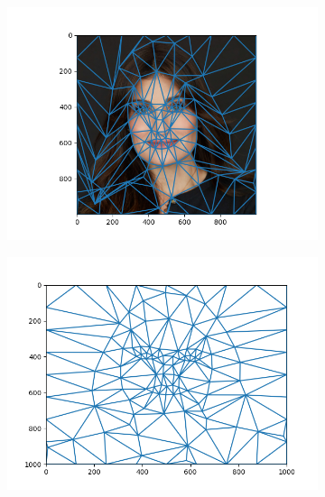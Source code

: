 \documentclass[a4paper]{article}
\begin{document}
\begin{figure}[H]
    \centering
    \begin{subfigure}{0.32\textwidth}
        \includegraphics[width=\textwidth]{../visuals/average_idina_menzel_mesh.png}
    \end{subfigure}
    \begin{subfigure}{0.32\textwidth}
        \includegraphics[width=\textwidth]{../visuals/average_mesh.png}
    \end{subfigure}
    \begin{subfigure}{0.32\textwidth}

\end{subfigure}
\end{figure}
\end{document}
